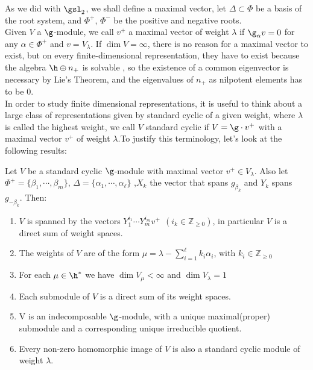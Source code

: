 As we did with $\gsl_2$, we shall define a maximal vector, let $\Delta \subset \Phi$ be a basis of the root system, and $\Phi^+$, $\Phi^-$ be the positive and negative roots.\\
Given $V$ a $\g$-module, we call $v^+$ a maximal vector of weight $\lambda$ if $\g_\alpha v = 0$ for any $\alpha \in \Phi^+$ and $v = V_\lambda$. If $\dim V = \infty$, there is no reason for a maximal vector to exist, but on every finite-dimensional representation, they have to exist because the algebra $\h \oplus n_+$ is solvable , so the existence of a common eigenvector is necessary by Lie's Theorem, and the eigenvalues of $n_+$ as nilpotent elements has to be $0$.\\
In order to study finite dimensional representations, it is useful to think about a large class of representations given by standard cyclic of a given weight, where $\lambda$ is called the highest weight, we call $V$ standard cyclic if $V=\g\cdot v^+$ with a maximal vector $v^+$ of weight $\lambda$.To justify this terminology, let's look at the following results:
\begin{teo}
Let $V$ be a standard cyclic $\g$-module with maximal vector $v^+ \in V_\lambda$. Also let $\Phi^+ = \{\beta_1,\cdots,\beta_m\}$, $\Delta = \{\alpha_1,\cdots,\alpha_\ell\}$ ,$X_k$ the vector that spans $g_{\beta_k}$ and $Y_k$ spans $g_{-\beta_k}$. Then:
\begin{enumerate}[label=(\alph*)]
\label{42standardcyclic}
\item $V$ is spanned by the vectors $Y_1^{i_1}\cdots Y_m^{i_m}v^+\ \ (i_k \in \mathbb{Z}_{\ge 0})$, in particular $V$ is a direct sum of weight spaces.
\item The weights of $V$ are of the form $\mu = \lambda - \sum_{i=1}^\ell k_i\alpha_i$, with $k_i \in \mathbb{Z}_{\ge 0}$ 
\item For each $\mu \in \h^*$ we have $\dim V_\mu < \infty$ and $\dim V_\lambda = 1$
\item Each submodule of $V$ is a direct sum of its weight spaces.
\item V is an indecomposable $\g$-module, with a unique maximal(proper) submodule and a corresponding unique irreducible quotient.
\item Every non-zero homomorphic image of $V$ is also a standard cyclic module of weight $\lambda$.
\end{enumerate}
\end{teo}
